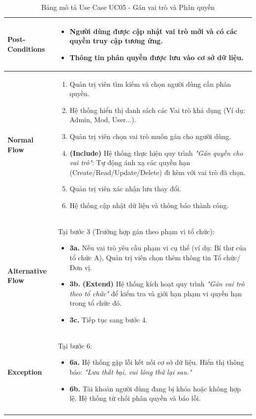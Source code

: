 \begin{longtable}{|m{}|m{}|}
\textbf{Post-Conditions} 
&
\begin{itemize}[label=--]
    \item Người dùng được cập nhật vai trò mới và có các quyền truy cập tương ứng.
    \item Thông tin phân quyền được lưu vào cơ sở dữ liệu.
\end{itemize}
\\ 
\hline

\textbf{Normal Flow} 
&
\begin{enumerate}
    \item Quản trị viên tìm kiếm và chọn người dùng cần phân quyền.
    \item Hệ thống hiển thị danh sách các Vai trò khả dụng (Ví dụ: Admin, Mod, User...).
    \item Quản trị viên chọn vai trò muốn gán cho người dùng.
    \item \textbf{(Include)} Hệ thống thực hiện quy trình \textit{"Gán quyền cho vai trò"}: Tự động ánh xạ các quyền hạn (Create/Read/Update/Delete) đi kèm với vai trò đã chọn.
    \item Quản trị viên xác nhận lưu thay đổi.
    \item Hệ thống cập nhật dữ liệu và thông báo thành công.
\end{enumerate}
\\ 
\hline

\textbf{Alternative Flow} 
& Tại bước 3 (Trường hợp gán theo phạm vi tổ chức):
\begin{itemize}
    \item \textbf{3a.} Nếu vai trò yêu cầu phạm vi cụ thể (ví dụ: Bí thư của tổ chức A), Quản trị viên chọn thêm thông tin Tổ chức/Đơn vị.
    \item \textbf{3b.} \textbf{(Extend)} Hệ thống kích hoạt quy trình \textit{"Gán vai trò theo tổ chức"} để kiểm tra và giới hạn phạm vi quyền hạn trong tổ chức đó.
    \item \textbf{3c.} Tiếp tục sang bước 4.
\end{itemize}
\\ 
\hline

\textbf{Exception} 
& Tại bước 6:
\begin{itemize}
    \item \textbf{6a.} Hệ thống gặp lỗi kết nối cơ sở dữ liệu. Hiển thị thông báo: \textit{"Lưu thất bại, vui lòng thử lại sau."}
    \item \textbf{6b.} Tài khoản người dùng đang bị khóa hoặc không hợp lệ. Hệ thống từ chối phân quyền và báo lỗi.
\end{itemize}
\\
\hline
\caption{Bảng mô tả Use Case UC05 - Gán vai trò và Phân quyền}
\end{longtable}